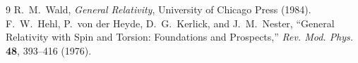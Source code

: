 \documentclass[12pt,a4paper]{article}
\theoremstyle{remark}\newtheorem{remark}[definition]{Remark}
\begin{document}
\begin{thebibliography}{9}
 R.~M.~Wald, \emph{General Relativity}, University of Chicago Press (1984).
 F.~W.~Hehl, P.~von der Heyde, D.~G.~Kerlick, and J.~M.~Nester,
``General Relativity with Spin and Torsion: Foundations and Prospects,''
\emph{Rev. Mod. Phys.} \textbf{48}, 393--416 (1976).
\end{thebibliography}
\end{document}
